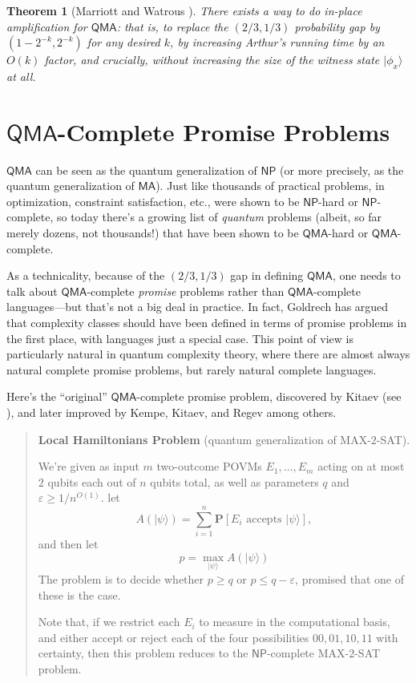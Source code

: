 \documentclass[12pt]{report}
\theoremstyle{plain}
\newtheorem{theorem}{Theorem}[section]
\theoremstyle{definition}
\newcommand{\eps}{\varepsilon}
\renewcommand{\Pr}{\mathbf{P}}
\renewcommand{\ket}[1]{|#1\rangle}
\begin{document}
\begin{theorem}[Marriott and Watrous \cite{DBLP:journals/cc/MarriottW05}]
There exists a way to do {\em in-place amplification} for $\mathsf{QMA}$: that is, to replace the $(2/3,1/3)$ probability gap by $(1-2^{-k},2^{-k})$ for any desired $k$, by increasing Arthur's running time by an $O(k)$ factor, and crucially, without increasing the size of the witness state $\ket{\phi_x}$ at all.
\end{theorem}

\section{$\mathsf{QMA}$-Complete Promise Problems}

$\mathsf{QMA}$ can be seen as the quantum generalization of $\mathsf{NP}$ (or more precisely, as the quantum generalization of $\mathsf{MA}$). Just like thousands of practical problems, in optimization, constraint satisfaction, etc., were shown to be $\mathsf{NP}$-hard or $\mathsf{NP}$-complete, so today there's a growing list of {\em quantum} problems (albeit, so far merely dozens, not thousands!) that have been shown to be $\mathsf{QMA}$-hard or $\mathsf{QMA}$-complete.

As a technicality, because of the $(2/3,1/3)$ gap in defining $\mathsf{QMA}$, one needs to talk about $\mathsf{QMA}$-complete {\em promise} problems rather than $\mathsf{QMA}$-complete languages---but that's not a big deal in practice.  In fact, Goldrech \cite{goldreich:promise} has argued that complexity classes should have been defined in terms of promise problems in the first place, with languages just a special case.  This point of view is particularly natural in quantum complexity theory, where there are almost always natural complete promise problems, but rarely natural complete languages.

Here's the ``original'' $\mathsf{QMA}$-complete promise problem, discovered by Kitaev (see \cite{KSV02}), and later improved by Kempe, Kitaev, and Regev \cite{kkr} among others.

\begin{quote}
\textbf{Local Hamiltonians Problem} (quantum generalization of MAX-$2$-SAT).

We're given as input $m$ two-outcome POVMs $E_1,\dots, E_m$ acting on at most $2$ qubits each out of $n$ qubits total, as well as parameters $q$ and $\eps \geq 1/n^{O(1)}$.  let
$$A(\ket{\psi}) = \sum_{i=1}^n \Pr[\text{$E_i$ accepts $\ket{\psi}$}],$$
and then let
$$p = \max_{\ket{\psi}} A(\ket{\psi})$$
The problem is to decide whether $p \geq q$ or $p \leq q - \eps$, promised that one of these is the case.

Note that, if we restrict each $E_i$ to measure in the computational basis, and either accept or reject each of the four possibilities $00,01,10,11$ with certainty, then this problem reduces to the $\mathsf{NP}$-complete MAX-$2$-SAT problem.
\end{quote}
\end{document}
